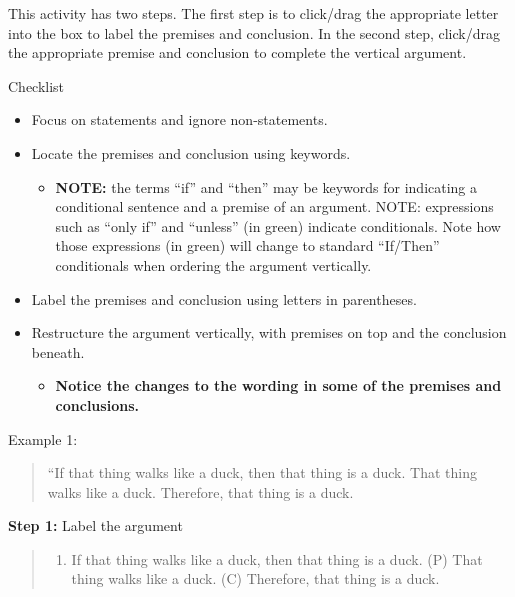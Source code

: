 \documentclass[
]{book}
\providecommand{\tightlist}{%
  \setlength{\itemsep}{0pt}\setlength{\parskip}{0pt}}
\begin{document}
\begin{reflect}
This activity has two steps. The first step is to click/drag the appropriate letter into the box to label the premises and conclusion. In the second step, click/drag the appropriate premise and conclusion to complete the vertical argument.

{Checklist}

\begin{itemize}
\tightlist
\item
  Focus on statements and ignore non-statements.\\
\item
  Locate the premises and conclusion using keywords.

  \begin{itemize}
  \tightlist
  \item
    \textbf{NOTE:} the terms ``if'' and ``then'' may be keywords for indicating a conditional sentence and a premise of an argument. NOTE: expressions such as ``only if'' and ``unless'' (in green) indicate conditionals. Note how those expressions (in green) will change to standard ``If/Then'' conditionals when ordering the argument vertically.\\
  \end{itemize}
\item
  Label the premises and conclusion using letters in parentheses.\\
\item
  Restructure the argument vertically, with premises on top and the conclusion beneath.

  \begin{itemize}
  \tightlist
  \item
    \textbf{Notice the changes to the wording in some of the premises and conclusions.}
  \end{itemize}
\end{itemize}

{Example 1:}

\begin{quote}
``If that thing walks like a duck, then that thing is a duck. That thing walks like a duck. Therefore, that thing is a duck.
\end{quote}

\textbf{Step 1:} Label the argument

\begin{quote}
\begin{enumerate}
\def\labelenumi{(\Alph{enumi})}
\setcounter{enumi}{15}
\tightlist
\item
  If that thing walks like a duck, then that thing is a duck. (P) That thing walks like a duck. (C) Therefore, that thing is a duck.
\end{enumerate}
\end{quote}


\end{reflect}
\end{document}

